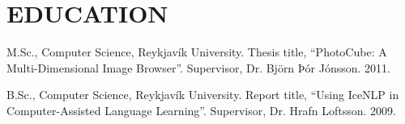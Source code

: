 \section{EDUCATION}
M.Sc., Computer Science, Reykjavík
University. Thesis title, ``PhotoCube: A
Multi-Dimensional Image Browser''. Supervisor, Dr. Björn Þór Jónsson. 2011.

B.Sc., Computer Science, Reykjavík University. Report title, ``Using IceNLP in
Computer-Assisted Language Learning''. Supervisor, Dr. Hrafn Loftsson. 2009.
